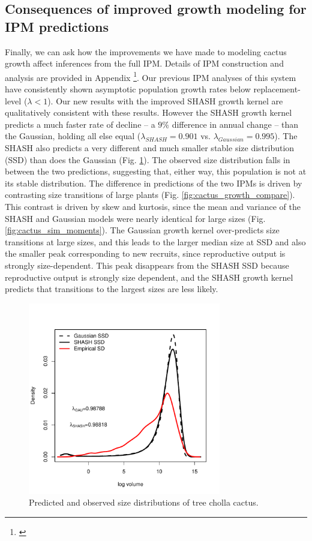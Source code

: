 \documentclass[12pt]{article}
\newcommand{\tom}[2]{{\color{red}{#1}}\footnote{\textit{\color{red}{#2}}}}
\begin{document}
\subsection{Consequences of improved growth modeling for IPM predictions}
Finally, we can ask how the improvements we have made to modeling cactus growth affect inferences from the full IPM.
Details of IPM construction and analysis are provided in Appendix \tom{\#}{Need to do. Maybe we can have one appendix for all the IPMs.}.
Our previous IPM analyses of this system have consistently shown asymptotic population growth rates below replacement-level ($\lambda < 1$).
Our new results with the improved SHASH growth kernel are qualitatively consistent with these results.
However the SHASH growth kernel predicts a much faster rate of decline -- a $9\%$ difference in annual change -- than the Gaussian, holding all else equal ($\lambda_{SHASH} = 0.901$ vs. $\lambda_{Gaussian} = 0.995$).
The SHASH also predicts a very different and much smaller stable size distribution (SSD) than does the Gaussian (Fig. \ref{fig:cactus_ssd}). 
The observed size distribution falls in between the two predictions, suggesting that, either way, this population is not at its stable distribution. 
The difference in predictions of the two IPMs is driven by contrasting size transitions of large plants (Fig. \ref{fig:cactus_growth_compare}).
This contrast is driven by skew and kurtosis, since the mean and variance of the SHASH and Gaussian models were nearly identical for large sizes (Fig. \ref{fig:cactus_sim_moments}). 
The Gaussian growth kernel over-predicts size transitions at large sizes, and this leads to the larger median size at SSD and also the smaller peak corresponding to new recruits, since reproductive output is strongly size-dependent. 
This peak disappears from the SHASH SSD because reproductive output is strongly size dependent, and the SHASH growth kernel predicts that transitions to the largest sizes are less likely. 
\begin{figure}
\centering
\includegraphics[width=0.75\textwidth]{figures/cactus_ssd}
\caption{Predicted and observed size distributions of tree cholla cactus.}
\label{fig:cactus_ssd}
\end{figure} 
 
\end{document}
